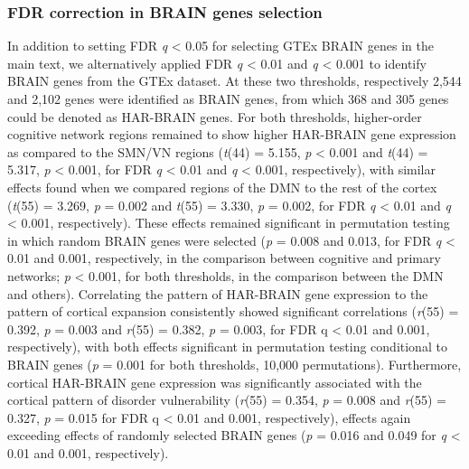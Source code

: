 \begin{refsection}
\subsubsection*{FDR correction in BRAIN genes selection}
In addition to setting FDR \textit{q} < 0.05 for selecting GTEx BRAIN genes in the main text,\textit{ }we alternatively applied FDR \textit{q} < 0.01 and \textit{q} < 0.001 to identify BRAIN genes from the GTEx dataset. At these two thresholds, respectively 2,544 and 2,102 genes were identified as BRAIN genes, from which 368 and 305 genes could be denoted as HAR-BRAIN genes. For both thresholds, higher-order cognitive network regions remained to show higher HAR-BRAIN gene expression as compared to the SMN/VN regions (\textit{t}(44) = 5.155, \textit{p} < 0.001 and \textit{t}(44) = 5.317, \textit{p} < 0.001, for FDR \textit{q} < 0.01 and \textit{q} < 0.001, respectively), with similar effects found when we compared regions of the DMN to the rest of the cortex (\textit{t}(55) = 3.269, \textit{p} = 0.002 and \textit{t}(55) = 3.330, \textit{p} = 0.002, for FDR \textit{q} < 0.01 and \textit{q} < 0.001, respectively). These effects remained significant in permutation testing in which random BRAIN genes were selected (\textit{p} = 0.008 and 0.013, for FDR \textit{q} < 0.01 and 0.001, respectively, in the comparison between cognitive and primary networks; \textit{p} < 0.001, for both thresholds, in the comparison between the DMN and others). Correlating the pattern of HAR-BRAIN gene expression to the pattern of cortical expansion consistently showed significant correlations (\textit{r}(55) = 0.392, \textit{p} = 0.003 and \textit{r}(55) = 0.382, \textit{p} = 0.003, for FDR q < 0.01 and 0.001, respectively), with both effects significant in permutation testing conditional to BRAIN genes (\textit{p} = 0.001 for both thresholds, 10,000 permutations). Furthermore, cortical HAR-BRAIN gene expression was significantly associated with the cortical pattern of disorder vulnerability (\textit{r}(55) = 0.354, \textit{p} = 0.008 and \textit{r}(55) = 0.327, \textit{p} = 0.015 for FDR q < 0.01 and 0.001, respectively), effects again exceeding effects of randomly selected BRAIN genes (\textit{p} = 0.016 and 0.049 for \textit{q} < 0.01 and 0.001, respectively).


\end{refsection}
